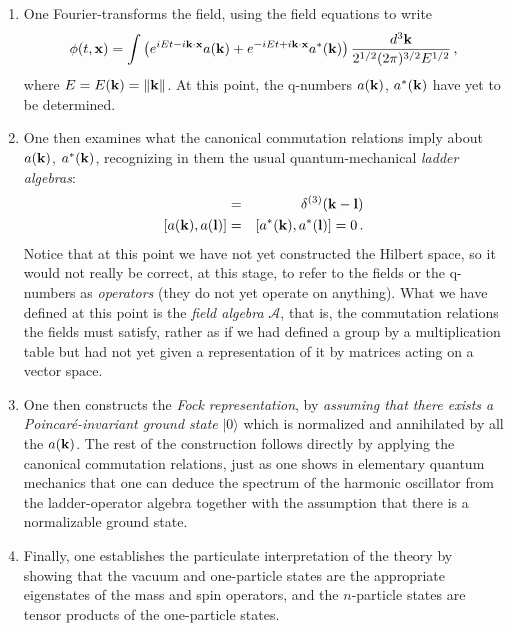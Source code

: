 \documentclass[12pt]{article}
\newcommand{\A}{{\mathcal A}}
\begin{document}
\begin{enumerate}

\item One Fourier-transforms the field, using the field equations to write
\begin{equation}
  \phi (t,{\bf x})=\int \left( e^{iEt-i{\bf k}\cdot {\bf x}} a({\bf k}) +e^{-iEt+i{\bf k}\cdot {\bf x}} a^*({\bf k})\right) 
  \frac{d^3{\bf k}}{2^{1/2}(2\pi )^{3/2}E^{1/2}}\, ,
\end{equation}
where $E=E({\bf k})=\| {\bf k}\|$.  At this point, the q-numbers $a({\bf k})$, $a^*({\bf k})$ have yet to be determined.

\item One then examines what the canonical commutation relations imply about $a({\bf k})$, $a^*({\bf k})$, recognizing in them the usual quantum-mechanical {\em ladder algebras}:
\begin{eqnarray}
  [a({\bf k}),a^*({\bf l})] &=& \delta ^{(3)}({\bf k}-{\bf l})\\
  \left[a ({\bf k}),a({\bf l})\right] &=&
      [a^* ({\bf k}),a^*({\bf l})]=0\, .
\end{eqnarray}
Notice that at this point we have not yet constructed the Hilbert space, so it would not really be correct, at this stage, to refer to the fields or the q-numbers as {\em operators} (they do not yet operate on anything).  What we have defined at this point is the {\em field algebra} $\A$, that is, the commutation relations the fields must satisfy, rather as if we had defined a group by a multiplication table but had not yet given a representation of it by matrices acting on a vector space.

\item One then constructs the {\em Fock representation}, by {\em assuming that there exists a Poincar\'e-invariant ground state} $|0\rangle$ which is normalized and annihilated by all the $a({\bf k})$.
The rest of the construction follows directly by applying the canonical commutation relations, just as one shows in elementary quantum mechanics that one can deduce the spectrum of the harmonic oscillator from the ladder-operator algebra together with the assumption that there is a normalizable ground state.

\item Finally, one establishes the particulate interpretation of the theory by showing 
that the vacuum and one-particle states are the appropriate eigenstates of the mass and spin operators, and the $n$-particle states are tensor products of the one-particle states.

\end{enumerate}
\end{document}
